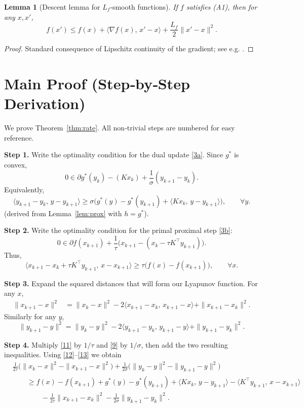 \documentclass{article}
\newtheorem{lemma}{Lemma}
\begin{document}
\begin{lemma}[Descent lemma for $L_{f}$‑smooth functions]\label{lem:descent}
If $f$ satisfies (A1), then for any $x,x'$,
\[
f(x')\le f(x)+\langle \nabla f(x),\,x'-x\rangle
      +\frac{L_{f}}{2}\|x'-x\|^{2}.
\tag{7}
\]
\end{lemma}
\begin{proof}
Standard consequence of Lipschitz continuity of the gradient; see e.g.
\cite{Nesterov2004}.
\end{proof}

\section*{Main Proof (Step‑by‑Step Derivation)}
We prove Theorem~\ref{thm:rate}.  
All non‑trivial steps are numbered for easy reference.

\bigskip
\noindent\textbf{Step 1.}  Write the optimality condition for the dual update \eqref{3a}.  
Since $g^{*}$ is convex,
\[
0\in \partial g^{*}(y_{k}) - (Kx_{k}) +\frac{1}{\sigma}(y_{k+1}-y_{k}) .
\tag{8}
\]
Equivalently,
\[
\langle y_{k+1}-y_{k},\,y-y_{k+1}\rangle
\ge \sigma\bigl(g^{*}(y)-g^{*}(y_{k+1}) +\langle Kx_{k},\,y-y_{k+1}\rangle\bigr),
\qquad\forall y .
\tag{9}
\]
(derived from Lemma~\ref{lem:prox} with $h=g^{*}$).

\bigskip
\noindent\textbf{Step 2.}  Write the optimality condition for the primal proximal step \eqref{3b}:
\[
0\in \partial f(x_{k+1}) +\frac{1}{\tau}\bigl(x_{k+1}-(x_{k}-\tau K^{\top}y_{k+1})\bigr).
\tag{10}
\]
Thus,
\[
\langle x_{k+1}-x_{k}+\tau K^{\top}y_{k+1},\,x-x_{k+1}\rangle
\ge \tau\bigl(f(x)-f(x_{k+1})\bigr),
\qquad\forall x .
\tag{11}
\]

\bigskip
\noindent\textbf{Step 3.}  Expand the squared distances that will form our Lyapunov function.
For any $x$,
\[
\begin{aligned}
\|x_{k+1}-x\|^{2}
&=\|x_{k}-x\|^{2}
  -2\langle x_{k+1}-x_{k},\,x_{k+1}-x\rangle
  +\|x_{k+1}-x_{k}\|^{2}.
\end{aligned}
\tag{12}
\]
Similarly for any $y$,
\[
\|y_{k+1}-y\|^{2}
=\|y_{k}-y\|^{2}
 -2\langle y_{k+1}-y_{k},\,y_{k+1}-y\rangle
 +\|y_{k+1}-y_{k}\|^{2}.
\tag{13}
\]

\bigskip
\noindent\textbf{Step 4.}  Multiply \eqref{11} by $1/\tau$ and \eqref{9} by $1/\sigma$, then add the two resulting inequalities.
Using \eqref{12}–\eqref{13} we obtain
\[
\begin{aligned}
&\frac{1}{2\tau}\bigl(\|x_{k}-x\|^{2}-\|x_{k+1}-x\|^{2}\bigr)
 +\frac{1}{2\sigma}\bigl(\|y_{k}-y\|^{2}-\|y_{k+1}-y\|^{2}\bigr) \\
&\qquad
\ge f(x)-f(x_{k+1})
   +g^{*}(y)-g^{*}(y_{k+1})
   +\langle Kx_{k},\,y-y_{k+1}\rangle
   -\langle K^{\top}y_{k+1},\,x-x_{k+1}\rangle \\
&\qquad\qquad
   -\frac{1}{2\tau}\|x_{k+1}-x_{k}\|^{2}
   -\frac{1}{2\sigma}\|y_{k+1}-y_{k}\|^{2}.
\end{aligned}
\tag{14}
\]
\end{document}
